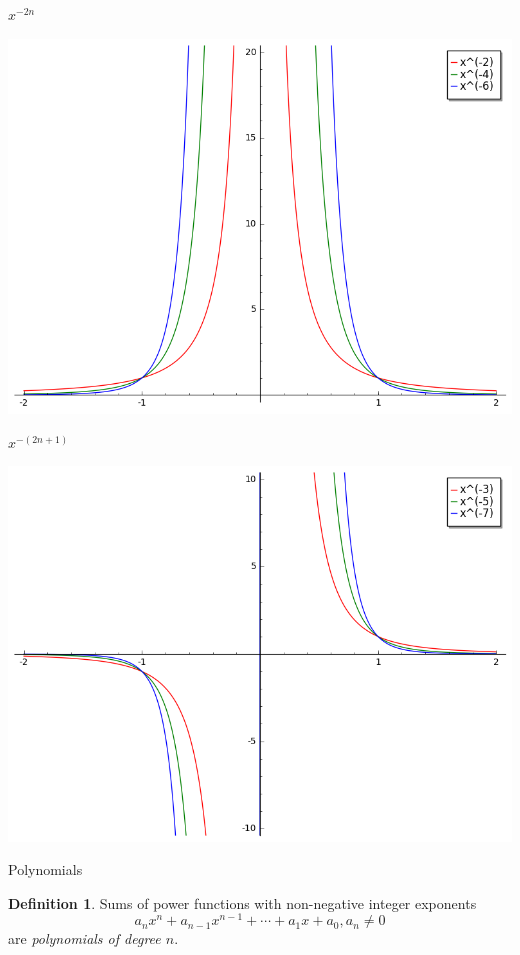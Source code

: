 \documentclass{beamer}
\theoremstyle{definition}
\newtheorem{defn}{Definition}
\newtheorem{rmk}{Remark}
\begin{document}
\begin{frame}{$x^{-2n}$}
  \begin{center}
    \includegraphics[scale=0.5]{imgs/power5.png}
  \end{center}
\end{frame}

\begin{frame}{$x^{-(2n + 1)}$}
  \begin{center}
    \includegraphics[scale=0.5]{imgs/power6.png}
  \end{center}
\end{frame}

\begin{frame}{Polynomials}
  \begin{defn}
    Sums of power functions with non-negative integer exponents
    $$a_nx^n + a_{n-1}x^{n-1} + \cdots + a_1x + a_0, a_n \neq 0$$
    are {\it polynomials of degree $n$}.
  \end{defn}

\end{frame}
\end{document}
